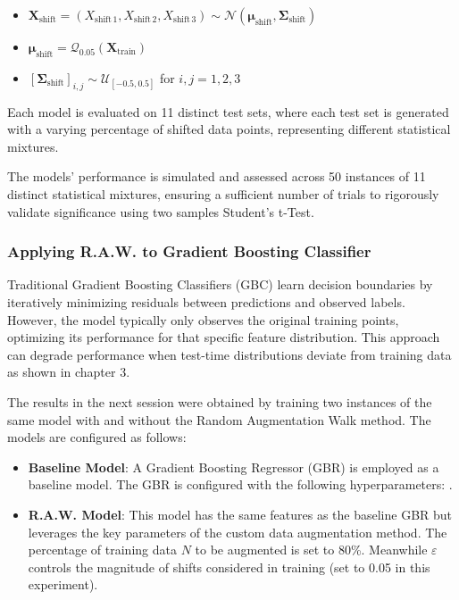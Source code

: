 \begin{itemize}
    \item $ \boldsymbol{X}_{\text{shift}} = (X_{\text{shift}\,1}, X_{\text{shift}\,2}, X_{\text{shift}\,3}) \sim \mathcal{N}(\boldsymbol{\mu}_{\text{shift}}, \boldsymbol{\Sigma}_{\text{shift}}) $
    \item $ \boldsymbol{\mu}_{\text{shift}} = \mathcal{Q}_{0.05}(\boldsymbol{X}_{\text{train}})$
    \item $ [\boldsymbol{\Sigma}_{\text{shift}}]_{i,j} \sim \mathcal{U}_{[-0.5,0.5]} $ for $ i, j = 1, 2, 3 $
\end{itemize}
Each model is evaluated on 11 distinct test sets, where each test set is generated with a varying percentage of shifted data points, representing different statistical mixtures.

The models' performance is simulated and assessed across 50 instances of 11 distinct statistical mixtures, ensuring a sufficient number of trials to rigorously validate significance using two samples Student's t-Test.

\subsubsection{Applying R.A.W. to Gradient Boosting Classifier}

Traditional Gradient Boosting Classifiers (GBC) learn decision boundaries by iteratively minimizing residuals between predictions and observed labels. However, the model typically only observes the original training points, optimizing its performance for that specific feature distribution. This approach can degrade performance when test-time distributions deviate from training data as shown in chapter 3. 

The results in the next session were obtained by training two instances of the same model with and without the Random Augmentation Walk method. The models are configured as follows:
\begin{itemize}
    \item \textbf{Baseline Model}: A Gradient Boosting Regressor (GBR) is employed as a baseline model. The GBR is configured with the following hyperparameters: .
    \item \textbf{R.A.W. Model}: This model has the same features as the baseline GBR but leverages the key parameters of the custom data augmentation method. The percentage of training data $N$ to be augmented is set to 80\%. Meanwhile $\varepsilon$ controls the magnitude of shifts considered in training (set to 0.05 in this experiment).
\end{itemize}






